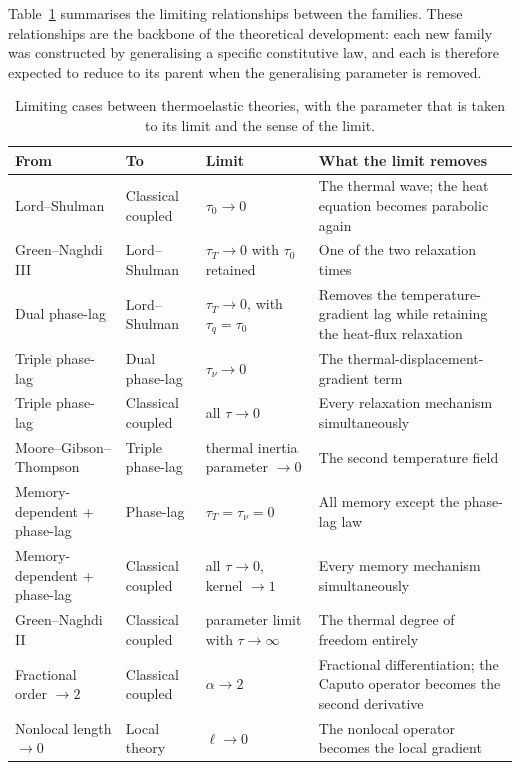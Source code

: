 Table~\ref{tab:limiting_cases_revisited} summarises the limiting relationships between the families. These relationships are the backbone of the theoretical development: each new family was constructed by generalising a specific constitutive law, and each is therefore expected to reduce to its parent when the generalising parameter is removed.

\begin{table}[h]
\centering
\small
\caption{Limiting cases between thermoelastic theories, with the parameter that is taken to its limit and the sense of the limit.}
\label{tab:limiting_cases_revisited}
\begin{tabularx}{\textwidth}{@{}lllX@{}}
\toprule
\textbf{From} & \textbf{To} & \textbf{Limit} & \textbf{What the limit removes} \\
\midrule
Lord--Shulman & Classical coupled & $\tau_0 \to 0$ & The thermal wave; the heat equation becomes parabolic again \\
Green--Naghdi III & Lord--Shulman & $\tau_T \to 0$ with $\tau_0$ retained & One of the two relaxation times \\
Dual phase-lag & Lord--Shulman & $\tau_T \to 0$, with $\tau_q=\tau_0$ & Removes the temperature-gradient lag while retaining the heat-flux relaxation \\
Triple phase-lag & Dual phase-lag & $\tau_\nu \to 0$ & The thermal-displacement-gradient term \\
Triple phase-lag & Classical coupled & all $\tau \to 0$ & Every relaxation mechanism simultaneously \\
Moore--Gibson--Thompson & Triple phase-lag & thermal inertia parameter $\to 0$ & The second temperature field \\
Memory-dependent + phase-lag & Phase-lag & $\tau_T=\tau_\nu=0$ & All memory except the phase-lag law \\
Memory-dependent + phase-lag & Classical coupled & all $\tau \to 0$, kernel $\to 1$ & Every memory mechanism simultaneously \\
Green--Naghdi II & Classical coupled & parameter limit with $\tau \to \infty$ & The thermal degree of freedom entirely \\
Fractional order $\to 2$ & Classical coupled & $\alpha \to 2$ & Fractional differentiation; the Caputo operator becomes the second derivative \\
Nonlocal length $\to 0$ & Local theory & $\ell \to 0$ & The nonlocal operator becomes the local gradient \\
\bottomrule
\end{tabularx}
\end{table}

